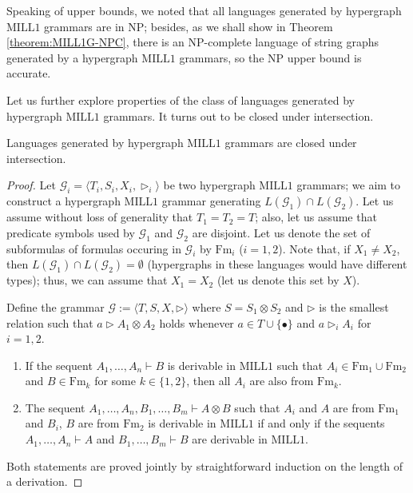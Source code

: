\documentclass[a4paper,UKenglish,cleveref, autoref, thm-restate,pdfa]{lipics-v2021}
\newcommand{\eqdef}{:=}
\newcommand{\Gram}{\mathcal{G}}
\newcommand{\Fm}{\mathrm{Fm}}
\newcommand{\mconj}{\otimes}
\newcommand{\MILLFO}{\mathrm{MILL}1}
\begin{document}
Speaking of upper bounds, we noted that all languages generated by hypergraph $\MILLFO$ grammars are in NP; besides, as we shall show in Theorem \ref{theorem:MILL1G-NPC}, there is an NP-complete language of string graphs generated by a hypergraph $\MILLFO$ grammars, so the NP upper bound is accurate. 

Let us further explore properties of the class of languages generated by hypergraph $\MILLFO$ grammars. It turns out to be closed under intersection.
\begin{theorem}\label{theorem:hypergraph-MILL1-grammars-intersection}
	Languages generated by hypergraph $\MILLFO$ grammars are closed under intersection.
\end{theorem}
\begin{proof}
	Let $\Gram_i = \langle T_i, S_i, X_i, \triangleright_i \rangle$ be two hypergraph $\MILLFO$ grammars; we aim to construct a hypergraph $\MILLFO$ grammar generating $L(\Gram_1) \cap L(\Gram_2)$. Let us assume without loss of generality that $T_1=T_2 = T$; also, let us assume that predicate symbols used by $\Gram_1$ and $\Gram_2$ are disjoint. Let us denote the set of subformulas of formulas occuring in $\Gram_i$ by $\Fm_i$ ($i=1,2$). Note that, if $X_1 \ne X_2$, then $L(\Gram_1) \cap L(\Gram_2) = \emptyset$ (hypergraphs in these languages would have different types); thus, we can assume that $X_1=X_2$ (let us denote this set by $X$).
	
	Define the grammar $\Gram \eqdef \langle T, S, X, \triangleright \rangle$ where $S = S_1 \mconj S_2$ and $\triangleright$ is the smallest relation such that $a \triangleright A_1 \mconj A_2$ holds whenever $a \in T \cup \{\bullet\}$ and $a \triangleright_i A_i$ for $i=1,2$.
	\begin{lemma}\label{lemma:splitting}
	\leavevmode
	\begin{enumerate}
		\item If the sequent $A_1,\ldots,A_n \vdash B$ is derivable in $\MILLFO$ such that $A_i \in \Fm_1 \cup \Fm_2$ and $B \in \Fm_k$ for some $k \in \{1,2\}$, then all $A_i$ are also from $\Fm_k$.
		\item The sequent $A_1,\ldots,A_n,B_1,\ldots,B_m \vdash A \mconj B$ such that $A_i$ and $A$ are from $\Fm_1$ and $B_i$, $B$ are from $\Fm_2$ is derivable in $\MILLFO$ if and only if the sequents $A_1,\ldots,A_n \vdash A$ and $B_1,\ldots,B_m \vdash B$ are derivable in $\MILLFO$.
	\end{enumerate}
	\end{lemma}
	Both statements are proved jointly by straightforward induction on the length of a derivation.
	

\end{proof}
\end{document}
